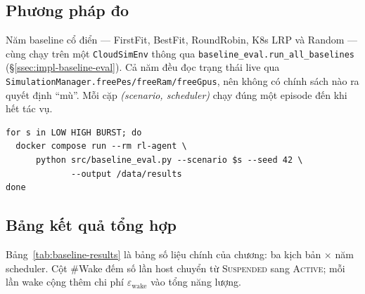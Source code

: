 \subsection{Phương pháp đo}
Năm baseline cổ điển --- FirstFit, BestFit, RoundRobin, K8s LRP và
Random --- cùng chạy trên một \texttt{CloudSimEnv} thông qua
\texttt{baseline\_eval.run\_all\_baselines}
(§\ref{ssec:impl-baseline-eval}). Cả năm đều đọc trạng thái live qua
\texttt{SimulationManager.freePes/freeRam/freeGpus}, nên không có
chính sách nào ra quyết định ``mù''. Mỗi cặp
\emph{(scenario, scheduler)} chạy đúng một episode đến khi hết tác
vụ.

\begin{lstlisting}[style=yamlstyle, label={lst:run-baseline-cmd}, caption={Lệnh chạy năm baseline trên ba kịch bản.}]
for s in LOW HIGH BURST; do
  docker compose run --rm rl-agent \
      python src/baseline_eval.py --scenario $s --seed 42 \
             --output /data/results
done
\end{lstlisting}

\subsection{Bảng kết quả tổng hợp}
\label{ssec:res-baseline-table}

Bảng~\ref{tab:baseline-results} là bảng số liệu chính của chương:
ba kịch bản $\times$ năm scheduler. Cột $\#$Wake đếm số lần host
chuyển từ \textsc{Suspended} sang \textsc{Active}; mỗi lần wake cộng
thêm chi phí $\varepsilon_{\mathrm{wake}}$ vào tổng năng lượng.

